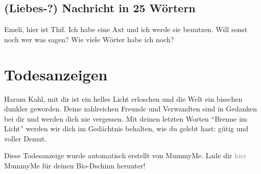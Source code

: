 \documentclass[final]{multiversum}
\begin{document}
\subsection{(Liebes-?) Nachricht in 25 Wörtern}
Emeli, hier ist Thif. Ich habe eine Axt und ich werde sie benutzen. Will sonst noch wer was sagen? Wie viele Wörter habe ich noch?

\section{Todesanzeigen}


Harum Kahl, mit dir ist ein helles Licht erloschen und die Welt ein bisschen dunkler geworden.
Deine zahlreichen Freunde und Verwandten sind in Gedanken bei dir und werden dich nie vergessen.
Mit deinen letzten Worten \enquote{Brenne im Licht} werden wir dich im Gedächtnis behalten, wie du gelebt hast: gütig und voller Demut.

Diese Todesanzeige wurde automatisch erstellt von MummyMe.
Lade dir \textcolor{gray}{hier} MummyMe für deinen Bio-Dschinn herunter!



\end{document}
